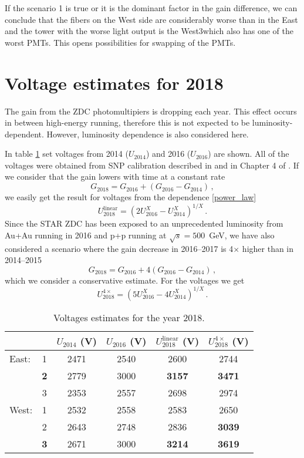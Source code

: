 \documentclass[a4paper,10pt]{article}
\begin{document}
If the scenario 1 is true or it is the dominant factor in the gain difference, we can conclude that the fibers on the West side are considerably worse than in the East and the tower with the worse light output is the West3\@ which also has one of the worst PMTs. This opens possibilities for swapping of the PMTs.

\section{Voltage estimates for 2018}
The gain from the ZDC photomultipiers is dropping each year. This effect occurs in between high-energy running, therefore this is not expected to be luminosity-dependent. However, luminosity dependence is also considered here.

In table \ref{voltsTable} set voltages from 2014 ($U_{2014}$) and 2016 ($U_{2016}$) are shown. All of the voltages were obtained from SNP calibration described in \cite{calib2014} and in Chapter 4 of \cite{ZDC_ops_manual}\@. If we consider that the gain lowers with time at a constant rate
\begin{equation}
G_{2018} = G_{2016} + (G_{2016} - G_{2014})\,,
\end{equation}
we easily get the result for voltages from the dependence \eqref{power_law}
\begin{equation}
U_{2018}^\text{linear} = (2 U_{2016}^X - U_{2014}^X)^{1/X}\,.
\end{equation}
Since the STAR ZDC has been exposed to an unprecedented luminosity from Au+Au running in 2016 and p+p running at $\sqrt{s} = 500$~GeV, we have also considered a scenario where the gain decrease in 2016--2017 is 4$\times$ higher than in 2014--2015
\begin{equation}
G_{2018} = G_{2016} + 4(G_{2016} - G_{2014})\,,
\end{equation}
which we consider a conservative estimate. For the voltages we get
\begin{equation}
U_{2018}^{4\times} = (5 U_{2016}^X - 4 U_{2014}^X)^{1/X}\,.
\end{equation}

\begin{table}[htb]
\caption{\label{voltsTable}Voltages estimates for the year 2018.}
\begin{center}
\begin{tabular}{lccccc}
\toprule
&&$U_{2014}$ (V)&$U_{2016}$ (V)& $U_{2018}^\text{linear}$ (V)&$U_{2018}^{4\times}$ (V)\\
\midrule
East:&1&2471&2540&2600&2744\\
&\textbf{2}&2779&3000&\textbf{3157}&\textbf{3471}\\
&3&2353&2557&2698&2974\\
\midrule
West:&1&2532&2558&2583&2650\\
&2&2643&2748&2836&\textbf{3039}\\
&\textbf{3}&2671&3000&\textbf{3214}&\textbf{3619}\\
\bottomrule
\end{tabular}
\end{center}
\end{table}
\end{document}
